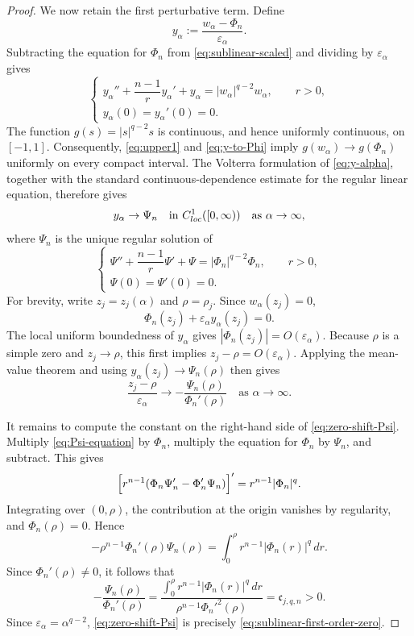 \documentclass[10pt,a4paper]{amsart}
\begin{document}
\begin{proof}
We now retain the first perturbative term.  Define
\[
 y_\alpha:=\frac{w_\alpha-\Phi_n}{\varepsilon_\alpha}.
\]
Subtracting the equation for $\Phi_n$ from
\eqref{eq:sublinear-scaled} and dividing by
$\varepsilon_\alpha$ gives
\begin{equation}
 \begin{cases}
 y_\alpha''+\dfrac{n-1}{r}y_\alpha'+y_\alpha
 =|w_\alpha|^{q-2}w_\alpha,\qquad  r>0,\\[4pt]
 y_\alpha(0)=y_\alpha'(0)=0.
 \end{cases}
 \label{eq:y-alpha}
\end{equation}
The function $g(s)=|s|^{q-2}s$ is continuous, and hence uniformly continuous, on $[-1,1]$.
Consequently, \eqref{eq:upper1} and \eqref{eq:y-to-Phi} imply
$g(w_\alpha)\to g(\Phi_n)$ uniformly on every compact interval.
The Volterra formulation of \eqref{eq:y-alpha}, together with the
standard continuous-dependence estimate for the regular linear
equation, therefore gives
\begin{equation*}
 y_\alpha\rightarrow\Psi_n
 \quad\text{in }C^1_{\rm loc}([0,\infty)){\quad\text{as }\alpha\rightarrow\infty},
\end{equation*}
where $\Psi_n$ is the unique regular solution of
\begin{equation}
 \begin{cases}
 \Psi''+\dfrac{n-1}{r}\Psi'+\Psi
 =|\Phi_n|^{q-2}\Phi_n,\qquad  r>0,\\[4pt]
 \Psi(0)=\Psi'(0)=0.
 \end{cases}
 \label{eq:Psi-equation}
\end{equation}
For brevity, write $z_j=z_j(\alpha)$ and $\rho=\rho_j$.
{Since $w_\alpha(z_j)=0$,
\[
 \Phi_n(z_j)+\varepsilon_\alpha y_\alpha(z_j)=0.
\]
The local uniform boundedness of $y_\alpha$ gives
$|\Phi_n(z_j)|=O(\varepsilon_\alpha)$.  Because $\rho$ is a simple zero
and $z_j\to\rho$, this first implies
$z_j-\rho=O(\varepsilon_\alpha)$.  Applying the mean-value theorem and
using $y_\alpha(z_j)\to\Psi_n(\rho)$ then gives}
\begin{equation}
\frac{z_j-\rho}{\varepsilon_\alpha}
\longrightarrow
-\frac{\Psi_n(\rho)}{\Phi_n'(\rho)}\quad \text{as }\alpha\rightarrow\infty.
\label{eq:zero-shift-Psi}
\end{equation}

It remains to compute the constant on the right-hand side of \eqref{eq:zero-shift-Psi}. Multiply \eqref{eq:Psi-equation} by $\Phi_n$, multiply the equation for $\Phi_n$ by $\Psi_n$, and subtract. This gives %
\[
 \Bigl[r^{n-1}(\Phi_n\Psi_n'-\Phi_n'\Psi_n)\Bigr]'
 =r^{n-1}|\Phi_n|^q.
\]
{Integrating over $(0,\rho)$, the contribution at the origin
vanishes by regularity, and $\Phi_n(\rho)=0$. Hence}
\[
 -\rho^{n-1}\Phi_n'(\rho)\Psi_n(\rho)
 =\int_0^\rho r^{n-1}|\Phi_n(r)|^q\,dr.
\]
Since $\Phi_n'(\rho)\neq0$, it follows that
\[
 -\frac{\Psi_n(\rho)}{\Phi_n'(\rho)}
 =\frac{\displaystyle\int_0^\rho
 r^{n-1}|\Phi_n(r)|^q\,dr}
 {\rho^{n-1}\Phi_n'^2(\rho)}
 =\mathfrak c_{j,q,n}>0.
\]
Since $\varepsilon_\alpha=\alpha^{q-2}$,
\eqref{eq:zero-shift-Psi} is precisely
\eqref{eq:sublinear-first-order-zero}.
\end{proof}
\end{document}
